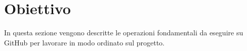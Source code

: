 \section{Obiettivo}

In questa sezione vengono descritte le operazioni fondamentali da eseguire su GitHub per lavorare in modo ordinato sul progetto.